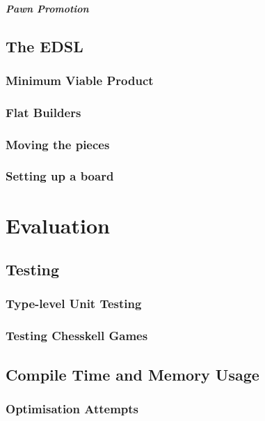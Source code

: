 \documentclass[12pt, a4paper, bibliography=totocnumbered]{scrreprt}
\begin{document}
\paragraph{Pawn Promotion}

\section{The EDSL}

\subsection{Minimum Viable Product}

\subsection{Flat Builders}

\subsection{Moving the pieces}

\subsection{Setting up a board}


\chapter{Evaluation}

\section{Testing}

\subsection{Type-level Unit Testing}

\subsection{Testing Chesskell Games}

\section{Compile Time and Memory Usage}

\subsection{Optimisation Attempts}
\end{document}
